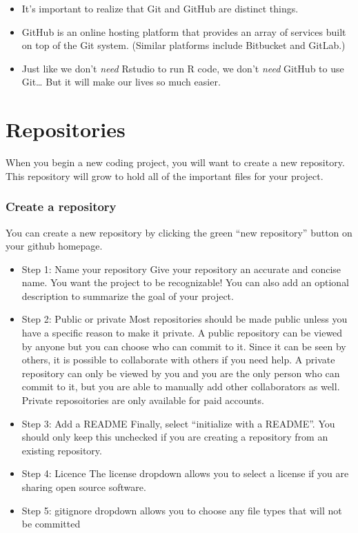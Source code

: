 \documentclass[
]{article}
\providecommand{\tightlist}{%
  \setlength{\itemsep}{0pt}\setlength{\parskip}{0pt}}
\begin{document}
\begin{itemize}
\tightlist
\item
  It's important to realize that Git and GitHub are distinct things.
\item
  GitHub is an online hosting platform that provides an array of
  services built on top of the Git system. (Similar platforms include
  Bitbucket and GitLab.)
\item
  Just like we don't \emph{need} Rstudio to run R code, we don't
  \emph{need} GitHub to use Git\ldots{} But it will make our lives so
  much easier.
\end{itemize}

\hypertarget{repositories}{%
\section{Repositories}\label{repositories}}

When you begin a new coding project, you will want to create a new
repository. This repository will grow to hold all of the important files
for your project.

\hypertarget{create-a-repository}{%
\subsubsection{Create a repository}\label{create-a-repository}}

You can create a new repository by clicking the green ``new repository''
button on your github homepage.

\begin{itemize}
\item
  Step 1: Name your repository Give your repository an accurate and
  concise name. You want the project to be recognizable! You can also
  add an optional description to summarize the goal of your project.
\item
  Step 2: Public or private Most repositories should be made public
  unless you have a specific reason to make it private. A public
  repository can be viewed by anyone but you can choose who can commit
  to it. Since it can be seen by others, it is possible to collaborate
  with others if you need help. A private repository can only be viewed
  by you and you are the only person who can commit to it, but you are
  able to manually add other collaborators as well. Private
  reposoitories are only available for paid accounts.
\item
  Step 3: Add a README Finally, select ``initialize with a README''. You
  should only keep this unchecked if you are creating a repository from
  an existing repository.
\item
  Step 4: Licence The license dropdown allows you to select a license if
  you are sharing open source software.
\item
  Step 5: gitignore dropdown allows you to choose any file types that
  will not be committed
\end{itemize}
\end{document}
